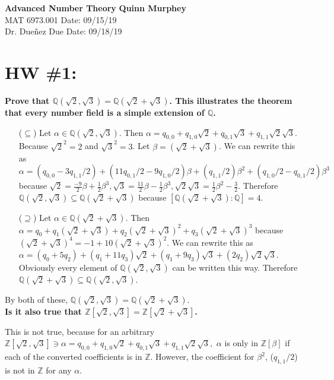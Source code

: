 \documentclass[letterpaper, 12pt]{article}
\begin{document}
\noindent
\large\textbf{Advanced Number Theory} \hfill \textbf{Quinn Murphey} \\
\normalsize MAT 6973.001 \hfill Date: 09/15/19 \\
Dr. Dueñez \hfill Due Date: 09/18/19 \\
\noindent\makebox[\linewidth]{\rule{\paperwidth}{0.4pt}}
\section*{HW \#1:}
\textbf{Prove that $\mathbb{Q}(\sqrt{2},\sqrt{3})=\mathbb{Q}(\sqrt{2}+\sqrt{3})$.  This illustrates the theorem that every number field is a simple extension of $\mathbb{Q}$.}

\begin{itemize}
    \item[($\subseteq$)] Let $\alpha\in\mathbb{Q}(\sqrt{2},\sqrt{3})$. Then $\alpha = q_{0,0} + q_{1,0}\sqrt{2} + q_{0,1}\sqrt{3} + q_{1,1}\sqrt{2}\sqrt{3}.$ Because $\sqrt{2}^2=2$ and $\sqrt{3}^2=3$. Let $\beta = (\sqrt{2}+\sqrt{3})$. We can rewrite this as $$\alpha = (q_{0,0} - 3q_{1,1}/2) + (11q_{0,1}/2 -9q_{1,0}/2)\beta + (q_{1,1}/2)\beta^2 + (q_{1,0}/2 - q_{0,1}/2)\beta^3$$ because $\sqrt{2} = \frac{-9}{2}\beta + \frac{1}{2}\beta^3,\sqrt{3} = \frac{11}{2}\beta-\frac{1}{2}\beta^3,\sqrt{2}\sqrt{3}= \frac{1}{2}\beta^2-\frac{3}{2}$. Therefore $\mathbb{Q}(\sqrt{2},\sqrt{3})\subseteq \mathbb{Q}(\sqrt{2}+\sqrt{3})$ because $[\mathbb{Q}(\sqrt{2}+\sqrt{3}):\mathbb{Q}] = 4$.
    
    \item[($\supseteq$)] Let $\alpha\in\mathbb{Q}(\sqrt{2}+\sqrt{3})$. Then $\alpha = q_0 + q_1(\sqrt{2}+\sqrt{3}) + q_2(\sqrt{2}+\sqrt{3})^2 + q_3(\sqrt{2}+\sqrt{3})^3$ because $(\sqrt{2}+\sqrt{3})^4 = -1 + 10(\sqrt{2}+\sqrt{3})^2$. We can rewrite this as $\alpha = (q_0+5q_2) + (q_1 + 11q_3)\sqrt{2} + (q_1 + 9q_3)\sqrt{3} + (2q_2)\sqrt{2}\sqrt{3}$. Obviously every element of $\mathbb{Q}(\sqrt{2},\sqrt{3})$ can be written this way. Therefore $\mathbb{Q}(\sqrt{2}+\sqrt{3}) \subseteq \mathbb{Q}(\sqrt{2},\sqrt{3})$.
\end{itemize}

    By both of these, $\mathbb{Q}(\sqrt{2},\sqrt{3})=\mathbb{Q}(\sqrt{2}+\sqrt{3})$.\\

\textbf{Is it also true that $\mathbb{Z}[\sqrt{2},\sqrt{3}] = \mathbb{Z}[\sqrt{2}+\sqrt{3}]$.}

    This is not true, because for an arbitrary $\mathbb{Z}[\sqrt{2},\sqrt{3}]\ni\alpha=q_{0,0} + q_{1,0}\sqrt{2} + q_{0,1}\sqrt{3} + q_{1,1}\sqrt{2}\sqrt{3},$ $\alpha$ is only in $\mathbb{Z}[\beta]$ if each of the converted coefficients is in $\mathbb{Z}$. However, the coefficient for $\beta^2$, ($q_{1,1}/2$) is not in $\mathbb{Z}$ for any $\alpha$.\\
\end{document}
